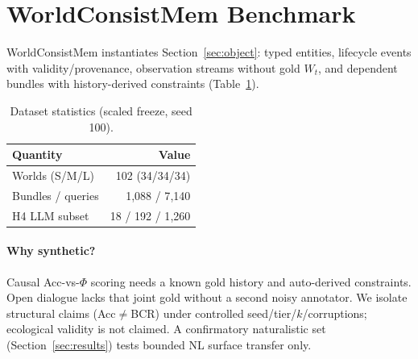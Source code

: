 \section{WorldConsistMem Benchmark}
\label{sec:benchmark}

WorldConsistMem instantiates Section~\ref{sec:object}: typed entities, lifecycle events with validity/provenance, observation streams without gold $W_t$, and dependent bundles with history-derived constraints (Table~\ref{tab:dataset}).

\begin{table}[t]
\centering
\caption{Dataset statistics (scaled freeze, seed 100).}
\label{tab:dataset}
\small
\begin{tabular}{lr}
\toprule
Quantity & Value \\
\midrule
Worlds (S/M/L) & 102 (34/34/34) \\
Bundles / queries & 1{,}088 / 7{,}140 \\
H4 LLM subset & 18 / 192 / 1{,}260 \\
\bottomrule
\end{tabular}
\end{table}

\paragraph{Why synthetic?} Causal Acc-vs-$\Phi$ scoring needs a known gold history and auto-derived constraints. Open dialogue lacks that joint gold without a second noisy annotator. We isolate structural claims (Acc$\neq$BCR) under controlled seed/tier/$k$/corruptions; ecological validity is not claimed. A confirmatory naturalistic set (Section~\ref{sec:results}) tests bounded NL surface transfer only.
